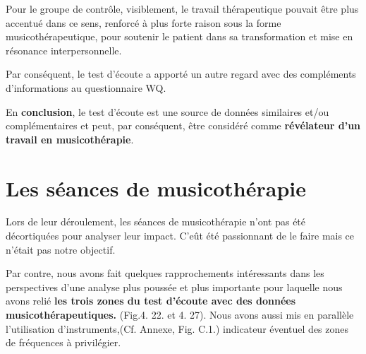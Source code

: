               Pour le groupe de contrôle, visiblement, le travail
                thérapeutique pouvait être plus accentué dans ce
                sens, renforcé à plus forte raison sous la forme musicothérapeutique, pour soutenir le
                patient dans sa transformation et mise en résonance
                interpersonnelle.


                Par conséquent,  le test d'écoute a
                apporté un autre regard avec des compléments d'informations au questionnaire
                WQ.

                En\textbf{ conclusion}, le test
                d'écoute est une source de données similaires
                et/ou complémentaires et peut, par conséquent, être
                considéré comme \textbf{révélateur d'un
                travail en musicothérapie}.

 \section{Les séances de musicothérapie}
               Lors de leur déroulement, les séances de
               musicothérapie n'ont pas été
décortiquées pour analyser leur impact. C'eût
été passionnant de le faire mais ce n'était pas notre objectif.


Par contre, nous avons fait quelques rapprochements intéressants dans les perspectives d'une analyse plus
poussée et plus importante pour laquelle nous avons  relié\textbf{ les trois zones du
test d'écoute avec des données musicothérapeutiques.}
(Fig.4. 22. et 4. 27).
Nous avons aussi mis
en parallèle  l'utilisation d'instruments,(Cf. Annexe, Fig. C.1.)
indicateur éventuel des zones de fréquences à
privilégier.




